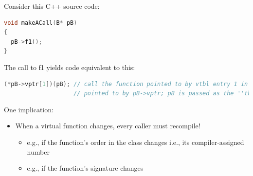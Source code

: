 Consider this C++ source code:
\begin{lstlisting}[language=C++]
void makeACall(B* pB)
{
  pB->f1();
}
\end{lstlisting}
The call to f1 yields code equivalent to this:
\begin{lstlisting}[language=C++]
(*pB->vptr[1])(pB); // call the function pointed to by vtbl entry 1 in the vtbl
                    // pointed to by pB->vptr; pB is passed as the ''this'' pointer
\end{lstlisting}
One implication:
\begin{itemize}
  \item When a virtual function changes, every caller must recompile!
  \begin{itemize}
    \item e.g., if the function's order in the class changes i.e., its compiler-assigned number
    \item e.g., if the function's signature changes
  \end{itemize}
\end{itemize}

